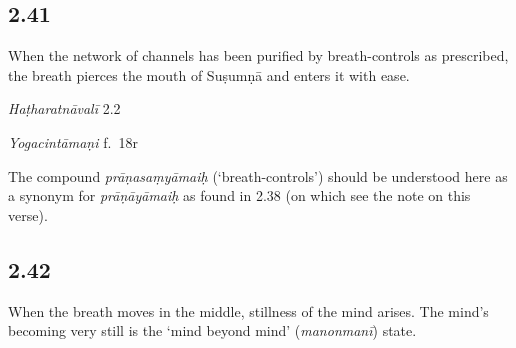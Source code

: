 \begin{ekdosis}
\begin{philcomm}[hp02_040]
\end{philcomm}

\subsection*{2.41}
\begin{translation}[hp02_041]
When the network of channels has been purified by breath-controls as prescribed, the breath pierces the mouth of Suṣumṇā and enters it with ease.
\end{translation}


\begin{testimonia}[hp02_041]
\emph{Haṭharatnāvalī} 2.2

\begin{versinnote}
\end{versinnote}

\emph{Yogacintāmaṇi} f.~18r

\begin{versinnote}
\end{versinnote}

\end{testimonia}

\begin{philcomm}[hp02_041]
The compound \emph{prāṇasaṃyāmaiḥ} (‘breath-controls’) should be understood here as a synonym for \emph{prāṇāyāmaiḥ} as found in 2.38 (on which see the note on this verse).
\end{philcomm}

\subsection*{2.42}
\begin{translation}[hp02_042]
When the breath moves in the middle, stillness of the mind arises. The mind’s becoming very still is the ‘mind beyond mind’ (\emph{manonmanī}) state.
\end{translation}


\end{ekdosis}
